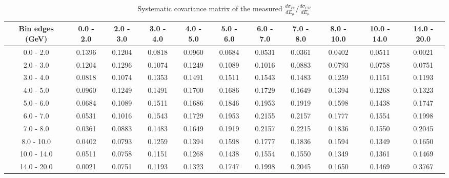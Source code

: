 \documentclass[aps,prl,twocolumn,superscriptaddress,nofootinbib]{revtex4-1}
\begin{document}
\begin{turnpage}
 \begin{table}[h!]
  \centering
  \caption{Systematic covariance matrix of the measured $\frac{d\sigma_{Fe}}{dE_{\mu}}/\frac{d\sigma_{CH}}{dE_{\mu}}$}
    \begin{tabular}{c||cccccccccc}
      Bin edges (GeV) & 0.0 - 2.0 & 2.0 - 3.0 & 3.0 - 4.0 & 4.0 - 5.0 & 5.0 - 6.0 & 6.0 - 7.0 & 7.0 - 8.0 & 8.0 - 10.0 & 10.0 - 14.0 & 14.0 - 20.0 \\
\hline \hline
        0.0 - 2.0 &  0.1396 &  0.1204 &  0.0818 &  0.0960 &  0.0684 &  0.0531 &  0.0361 &  0.0402 &  0.0511 &  0.0021 \\
        2.0 - 3.0 &  0.1204 &  0.1296 &  0.1074 &  0.1249 &  0.1089 &  0.1016 &  0.0883 &  0.0793 &  0.0758 &  0.0751 \\
        3.0 - 4.0 &  0.0818 &  0.1074 &  0.1353 &  0.1491 &  0.1511 &  0.1543 &  0.1483 &  0.1259 &  0.1151 &  0.1193 \\
        4.0 - 5.0 &  0.0960 &  0.1249 &  0.1491 &  0.1700 &  0.1686 &  0.1729 &  0.1649 &  0.1394 &  0.1268 &  0.1323 \\
        5.0 - 6.0 &  0.0684 &  0.1089 &  0.1511 &  0.1686 &  0.1846 &  0.1953 &  0.1919 &  0.1598 &  0.1438 &  0.1747 \\
        6.0 - 7.0 &  0.0531 &  0.1016 &  0.1543 &  0.1729 &  0.1953 &  0.2155 &  0.2157 &  0.1777 &  0.1554 &  0.1998 \\
        7.0 - 8.0 &  0.0361 &  0.0883 &  0.1483 &  0.1649 &  0.1919 &  0.2157 &  0.2215 &  0.1836 &  0.1550 &  0.2045 \\
       8.0 - 10.0 &  0.0402 &  0.0793 &  0.1259 &  0.1394 &  0.1598 &  0.1777 &  0.1836 &  0.1594 &  0.1349 &  0.1650 \\
      10.0 - 14.0 &  0.0511 &  0.0758 &  0.1151 &  0.1268 &  0.1438 &  0.1554 &  0.1550 &  0.1349 &  0.1361 &  0.1469 \\
      14.0 - 20.0 &  0.0021 &  0.0751 &  0.1193 &  0.1323 &  0.1747 &  0.1998 &  0.2045 &  0.1650 &  0.1469 &  0.3767 \\
    \end{tabular}
  \label{tablecov:Fe_Systematic_Emu}
  \end{table}
\end{turnpage}
\end{document}
